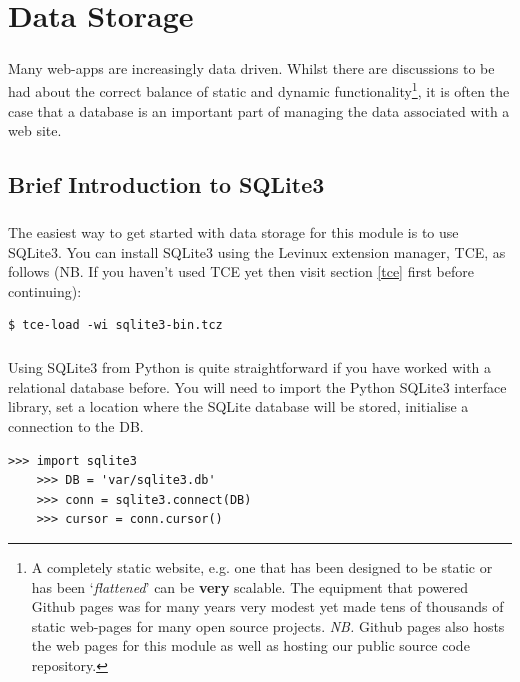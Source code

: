 \documentclass[12pt, a4paper, twoside]{book}
\begin{document}

\chapter{Data Storage}
\label{lab08}
\paragraph{} Many web-apps are increasingly data driven. Whilst there are discussions to be had about the correct balance of static and dynamic functionality\footnote{A completely static website, e.g. one that has been designed to be static or has been `\emph{flattened}' can be {\bf{very}} scalable. The equipment that powered Github pages was for many years very modest yet made tens of thousands of static web-pages for many open source projects. \emph{NB.} Github pages also hosts the web pages for this module as well as hosting our public source code repository.}, it is often the case that a database is an important part of managing the data associated with a web site.

\section{Brief Introduction to SQLite3}
\label{sqlite3-intro}
\paragraph{} The easiest way to get started with data storage for this module is to use SQLite3. You can install SQLite3 using the Levinux extension manager, TCE, as follows  (NB. If you haven't used TCE yet then visit section \ref{tce} first before continuing):

\begin{lstlisting}[style=DOS]
    $ tce-load -wi sqlite3-bin.tcz
\end{lstlisting}

\paragraph{} Using SQLite3 from Python is quite straightforward if you have worked with a relational database before. You will need to import the Python SQLite3 interface library, set a location where the SQLite database will be stored, initialise a connection to the DB. 


\begin{lstlisting}[style=DOS]
    >>> import sqlite3
    >>> DB = 'var/sqlite3.db'
    >>> conn = sqlite3.connect(DB)
    >>> cursor = conn.cursor()
\end{lstlisting}
\end{document}
